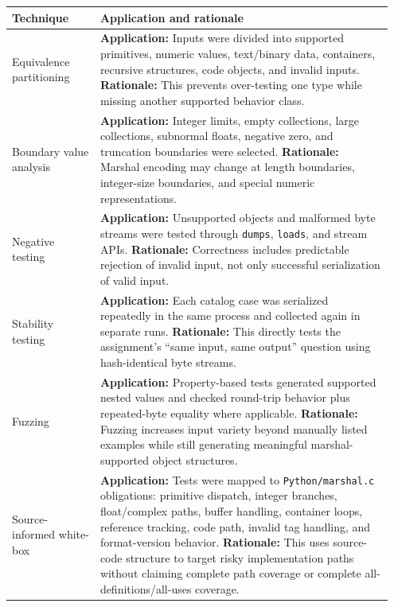 \documentclass[10pt,a4paper]{article}
\begin{document}
\begin{longtable}{@{}L{0.22\linewidth}L{0.73\linewidth}@{}}
\toprule
\textbf{Technique} & \textbf{Application and rationale} \\
\midrule

Equivalence partitioning &
\textbf{Application:} Inputs were divided into supported primitives, numeric values, text/binary data, containers, recursive structures, code objects, and invalid inputs. \newline
\textbf{Rationale:} This prevents over-testing one type while missing another supported behavior class. \\

Boundary value analysis &
\textbf{Application:} Integer limits, empty collections, large collections, subnormal floats, negative zero, and truncation boundaries were selected. \newline
\textbf{Rationale:} Marshal encoding may change at length boundaries, integer-size boundaries, and special numeric representations. \\

Negative testing &
\textbf{Application:} Unsupported objects and malformed byte streams were tested through \texttt{dumps}, \texttt{loads}, and stream APIs. \newline
\textbf{Rationale:} Correctness includes predictable rejection of invalid input, not only successful serialization of valid input. \\

Stability testing &
\textbf{Application:} Each catalog case was serialized repeatedly in the same process and collected again in separate runs. \newline
\textbf{Rationale:} This directly tests the assignment's ``same input, same output'' question using hash-identical byte streams. \\

Fuzzing &
\textbf{Application:} Property-based tests generated supported nested values and checked round-trip behavior plus repeated-byte equality where applicable. \newline
\textbf{Rationale:} Fuzzing increases input variety beyond manually listed examples while still generating meaningful marshal-supported object structures. \\

Source-informed white-box &
\textbf{Application:} Tests were mapped to \texttt{Python/marshal.c} obligations: primitive dispatch, integer branches, float/complex paths, buffer handling, container loops, reference tracking, code path, invalid tag handling, and format-version behavior. \newline
\textbf{Rationale:} This uses source-code structure to target risky implementation paths without claiming complete path coverage or complete all-definitions/all-uses coverage. \\


\end{longtable}
\end{document}
